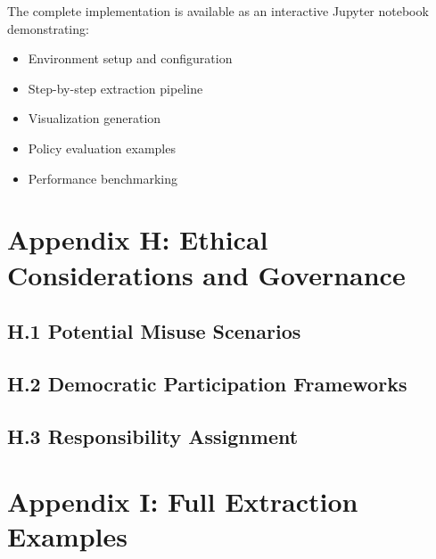\documentclass[
  11pt,
  letterpaper,
]{book}
\providecommand{\tightlist}{%
  \setlength{\itemsep}{0pt}\setlength{\parskip}{0pt}}
\begin{document}
The complete implementation is available as an interactive Jupyter
notebook demonstrating:

\begin{itemize}
\tightlist
\item
  Environment setup and configuration
\item
  Step-by-step extraction pipeline
\item
  Visualization generation
\item
  Policy evaluation examples
\item
  Performance benchmarking
\end{itemize}

\section*{Appendix H: Ethical Considerations and
Governance}\label{sec-appendix-ethical}


\subsection*{H.1 Potential Misuse Scenarios}\label{sec-misuse-scenarios}

\subsection*{H.2 Democratic Participation
Frameworks}\label{sec-democratic-frameworks}

\subsection*{H.3 Responsibility Assignment}\label{sec-responsibility}

\section*{Appendix I: Full Extraction
Examples}\label{sec-appendix-examples}

\end{document}
